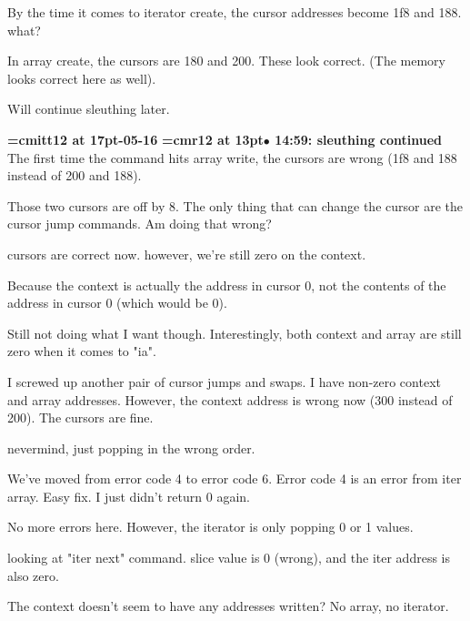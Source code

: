 By the time it comes to iterator create, the cursor addresses become 1f8 and 188. what?
\par

In array create, the cursors are 180 and 200. These look correct. (The memory looks correct here as well).
\par

Will continue sleuthing later.
\par

{\medskip\noindent\bf\font\titlefont=cmitt12 at 17pt-05-16}\medskip
{\smallskip\noindent\bf\font\titlefont=cmr12 at 13pt\titlefont $\bullet$ 14:59: sleuthing continued}\smallskip
The first time the command hits array write, the cursors are wrong (1f8 and 188 instead of 200 and 188).
\par

Those two cursors are off by 8. The only thing that can change the cursor are the cursor jump commands. Am doing that wrong?
\par

cursors are correct now. however, we're still zero on the context.
\par

Because the context is actually the address in cursor 0, not the contents of the address in cursor 0 (which would be 0).
\par

Still not doing what I want though. Interestingly, both context and array are still zero when it comes to "ia".
\par

I screwed up another pair of cursor jumps and swaps. I have non-zero context and array addresses. However, the context address is wrong now (300 instead of 200). The cursors are fine.
\par

nevermind, just popping in the wrong order.
\par

We've moved from error code 4 to error code 6. Error code 4 is an error from iter array. Easy fix. I just didn't return 0 again.
\par

No more errors here. However, the iterator is only popping 0 or 1 values.
\par

looking at "iter next" command. slice value is 0 (wrong), and the iter address is also zero.
\par

The context doesn't seem to have any addresses written? No array, no iterator.
\par

